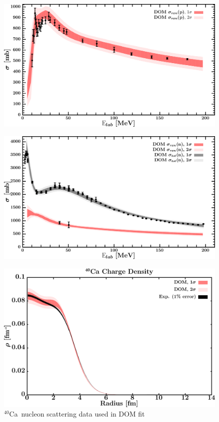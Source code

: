 \documentclass[twocolumn,secnumarabic,amssymb, nobibnotes, aps, prl,
superscriptaddress, nobalancelastpage, draft]{revtex4}
\newcommand{\caForty}{\ensuremath{^{40}}C\lowercase{a}}
\begin{document}
\begin{figure}[!htb]
\begin{minipage}{0.4\linewidth}
        \label{DOM_ca40_neutron_elastic}
    \end{minipage}
    \centering
    \begin{minipage}{0.4\linewidth}
        \centering
        \includegraphics[width=\linewidth]{figures/ca40_protonInelastic.png}
        \label{DOM_ca40_proton_inelastic}
    \end{minipage}\hspace{6pt}
    \begin{minipage}{0.4\linewidth}
        \centering
        \includegraphics[width=\linewidth]{figures/ca40_neutronInelastic.png}
        \label{DOM_ca40_neutron_inelastic}
    \end{minipage}
    \caption{\caForty\ nucleon scattering data used in DOM fit}
    \label{DOM_ca40_scattering}
    \centering
    \begin{minipage}{0.4\linewidth}
        \centering
        \includegraphics[width=\linewidth]{figures/ca40_chargeDensity.png}

\end{minipage}
\end{figure}
\end{document}
